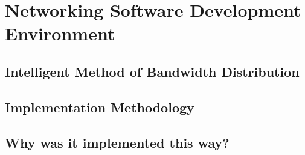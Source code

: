 \chapter{Networking Software Development Environment}
\label{chapter4}


\section{Intelligent Method of Bandwidth Distribution}


\section{Implementation Methodology}


\section{Why was it implemented this way?}

